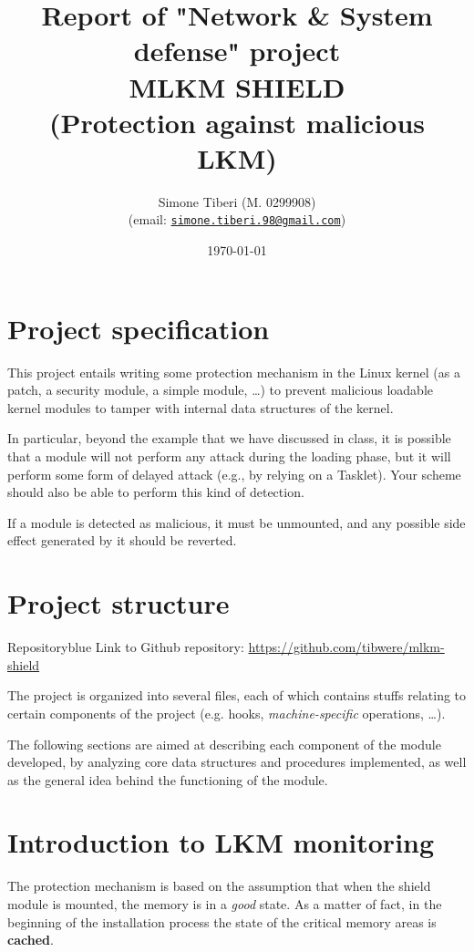 \documentclass{article}
\title{\small Report of "Network \& System defense" project \\
\Huge \textbf{MLKM SHIELD}\\
\Large (Protection against malicious LKM)}
\author{Simone Tiberi (M. 0299908)\\%
(email: \texttt{\href{mailto:simone.tiberi.98@gmail.com}{simone.tiberi.98@gmail.com}})}
\date{\today}
\begin{document}
	\begin{titlepage}
		\maketitle
	\end{titlepage}
	\tableofcontents
	\newpage

	\section{Project specification}
	This project entails writing some protection mechanism in the Linux kernel (as a patch, a security module, a simple
	module, \dots) to prevent malicious loadable kernel modules to tamper with internal data structures of the kernel.

	In particular, beyond the example that we have discussed in class, it is possible that a module will not perform
	any attack during the loading phase, but it will perform some form of delayed attack (e.g., by relying on a
	Tasklet). Your scheme should also be able to perform this kind of detection.

	If a module is detected as malicious, it must be unmounted, and any possible side effect generated by it should be
	reverted.

	\section{Project structure}
	\begin{custombox}{Repository}{blue}
		Link to Github repository: \url{https://github.com/tibwere/mlkm-shield}
	\end{custombox}

	The project is organized into several files, each of which contains stuffs relating to certain components of the
	project (e.g. hooks, \textit{machine-specific} operations, \dots).

	The following sections are aimed at describing each component of the module developed, by analyzing core data
	structures and procedures implemented, as well as the general idea behind the functioning of the module.

	\section{Introduction to LKM monitoring}
	The protection mechanism is based on the assumption that when the shield module is mounted, the memory is in a
	\textit{good} state. As a matter of fact, in the beginning of the installation process the state of the critical
	memory areas is \textbf{cached}.
\end{document}

